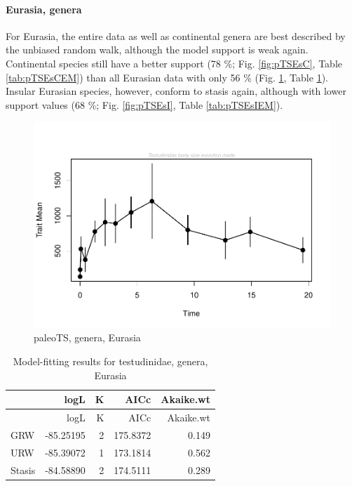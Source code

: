 \FloatBarrier



\paragraph{Eurasia,	genera}\label{eurasia-genera}


For Eurasia, the entire data as well as continental genera are best described by the unbiased random walk, although the model support is weak again. Continental species still have a better support (78 \%; Fig. \ref{fig:pTSEsC}, Table \ref{tab:pTSEsCEM}) than all Eurasian data with only 56 \% (Fig. \ref{fig:pTSEs}, Table \ref{tab:pTSEsEM}). Insular Eurasian species, however, conform to stasis again, although with lower support values (68 \%; Fig. \ref{fig:pTSEsI}, Table \ref{tab:pTSEsIEM}).



\begin{figure}[H]
	\centering
	\includegraphics{MA_JJ_files/figure-latex/paleoTSEurasia-1.pdf}
	\caption{paleoTS, genera, Eurasia}
	\label{fig:pTSEs}
\end{figure}

\begin{longtable}[]{@{}lrrrr@{}}
	\caption{Model-fitting results for testudinidae, genera,
		Eurasia}
	\label{tab:pTSEsEM}\tabularnewline
	\toprule
	& logL & K & AICc & Akaike.wt\tabularnewline
	\midrule
	\endfirsthead
	\toprule
	& logL & K & AICc & Akaike.wt\tabularnewline
	\midrule
	\endhead
	GRW & -85.25195 & 2 & 175.8372 & 0.149\tabularnewline
	URW & -85.39072 & 1 & 173.1814 & 0.562\tabularnewline
	Stasis & -84.58890 & 2 & 174.5111 & 0.289\tabularnewline
	\bottomrule
\end{longtable}



\FloatBarrier

